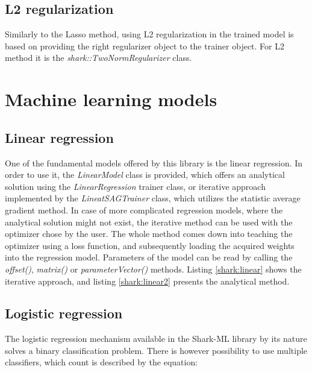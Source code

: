 \subsection{L2 regularization}

Similarly to the Lasso method, using L2 regularization in the trained model is based on providing the right regularizer object to the trainer object. For L2 method it is the \textit{shark::TwoNormRegularizer} class.

\section{Machine learning models}

\subsection{Linear regression}

One of the fundamental models offered by this library is the linear regression. In order to use it, the \textit{LinearModel} class is provided, which offers an analytical solution using the \textit{LinearRegression} trainer class, or iterative approach implemented by the \textit{LineatSAGTrainer} class, which utilizes the statistic average gradient method. In case of more complicated regression models, where the analytical solution might not exist, the iterative method can be used with the optimizer chose by the user. The whole method comes down into teaching the optimizer using a loss function, and subsequently loading the acquired weights into the regression model. Parameters of the model can be read by calling the \textit{offset()}, \textit{matrix()} or \textit{parameterVector()} methods. Listing \ref{shark:linear} shows the iterative approach, and listing \ref{shark:linear2} presents the analytical method. 


\newpage
{}

\subsection{Logistic regression}

The logistic regression mechanism available in the Shark-ML library by its nature solves a binary classification problem. There is however possibility to use multiple classifiers, which count is described by the equation:

